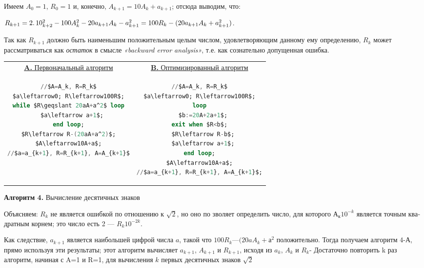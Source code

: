 \documentclass{mai_book}
\begin{document}
Имеем $A_{0} = 1$, $R_{0} = 1$ и, конечно, $A_{k+1} = 10A_{k} + a_{k+1}$; отсюда выводим, что:
\begin{center}
$R_{k+1} = 2\ldotp 10^{2}_{k+2} - 100A^{2}_{k} - 20a_{k+1}A_{k} - a^{2}_{k+1} = 100R_{k} - (20a_{k+1}A_{k} + a^{2}_{k+1})$.
\end{center}
Так как $R_{k+1}$ должно быть наименьшим положительным целым числом, удовлетворяющим данному ему определению, $R_{k}$ может рассматриваться как \textit{остаток} в смысле \textit{«backward error analysis»}, т.е. как сознательно допущенная ошибка.
\begin{table}[h!]
\centering
\begin{tabular}{|c|c|}
\hline
\underline{\textbf{A.} Первоначальный алгоритм} & \underline{\textbf{B.} Оптимизированный алгоритм} \\
{\begin{lstlisting}[mathescape=true, language=Ada, frame=none]
//$A=A_k, R=R_k$
$a\leftarrow0; R\leftarrow100R$;
while $R\geqslant 20aA+a^2$ loop
  $a\leftarrow a+1$;
end loop;
$R\leftarrow R-(20aA+a^2)$;
$A\leftarrow10A+a$;
//$a=a_{k+1}, R=R_{k+1}, A=A_{k+1}$
\end{lstlisting}}
&
{\begin{lstlisting}[mathescape=true, language=Ada, frame=none]
//$A=A_k, R=R_k$
$a\leftarrow0; R\leftarrow100R$;
loop
  $b:=20A+2a+1$;
exit when $R<b$;
  $R\leftarrow R-b$;
  $a\leftarrow a+1$;
end loop;
$A\leftarrow10A+a$;
//$a=a_{k+1}, R=R_{k+1}, A=A_{k+1}$;
\end{lstlisting}}
\\ \hline
\end{tabular}
\end{table}
\begin{center}
\textbf{Алгоритм 4.} Вычисление десятичных знаков
\end{center}
\newpage

Объясняем: $R_{k}$ не является ошибкой по отношению  к $\sqrt{2}$,
  но  оно  по­
зволяет определить  число,  для  которого $А_{к}10^{-k}$
  является  точным  ква­
дратным  корнем;  это число есть  2 — $R_{k}10^{-2k}$.

Как следствие,  $a_{k+1}$  является  наибольшей  цифрой  числа $a$,
  такой 
что  $100R_{k} — (20aA_{k} +  а^{2}$
положительно. Тогда получаем  алгоритм 4-А, 
прямо используя эти  результаты;  этот алгоритм вычисляет  $a_{k+1}$,  $A_{k+1}$ и $R_{k+1}$,
  исходя  из 
$a_{k}$, $A_{k}$ и $R_{k}$-
  Достаточно повторить k
  раз  алгоритм, 
начиная  с 
A=1  и 
R=1,  для  вычисления 
$k$ первых  десятичных  зна­ков $\sqrt{2}$
\end{document}
